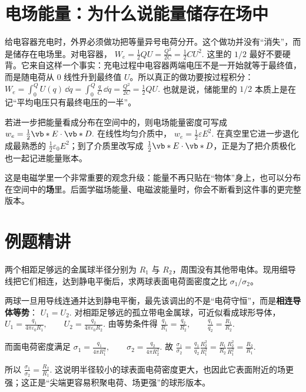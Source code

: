 \documentclass[lang=cn,11pt]{elegantbook}
\newcommand{\bridge}[1]{\begin{note}#1\end{note}}
\begin{document}
\section{电场能量：为什么说能量储存在场中}

给电容器充电时，外界必须做功把等量异号电荷分开。这个做功并没有“消失”，而是储存在电场里。对电容器，
 \(W_e=\frac{1}{2}QU =\frac{Q^2}{2C} =\frac{1}{2}CU^2.\) 
这里的 \(1/2\) 最好不要硬背。它来自这样一个事实：充电过程中电容器两端电压不是一开始就等于最终值，而是随电荷从 \(0\) 线性升到最终值 \(U\)。所以真正的做功要按过程积分：
 \(W_e=\int_0^Q U(q)\,\dd q =\int_0^Q \frac{q}{C}\,\dd q =\frac{Q^2}{2C} =\frac12 QU.\) 
也就是说，储能里的 \(1/2\) 本质上是在记“平均电压只有最终电压的一半”。

若进一步把能量看成分布在空间中的，则电场能量密度可写成
 \(w_e=\frac{1}{2}\vb*{E}\cdot \vb*{D}.\) 
在线性均匀介质中，
 \(w_e=\frac{1}{2}\varepsilon E^2.\) 
在真空里它进一步退化成最熟悉的 \(\frac12\varepsilon_0E^2\)；到了介质里改写成 \(\frac12\vb*{E}\cdot\vb*{D}\)，正是为了把介质极化也一起记进能量账本。

\bridge{这是电磁学里一个非常重要的观念升级：能量不再只贴在“物体”身上，也可以分布在空间中的\textbf{场}里。后面学磁场能量、电磁波能量时，你会不断看到这件事的更完整版本。}

\section{例题精讲}

\begin{exercise}[相连金属球的表面电荷密度比]
两个相距足够远的金属球半径分别为 \(R_1\) 与 \(R_2\)，周围没有其他带电体。现用细导线把它们相连，达到静电平衡后，求两球表面电荷面密度之比 \(\sigma_1/\sigma_2\)。
\end{exercise}

\begin{solution}
两球一旦用导线连通并达到静电平衡，最先该调出的不是“电荷守恒”，而是\textbf{相连导体等势}：
 \(U_1=U_2.\) 
对相距足够远的孤立带电金属球，可近似看成球形导体，
 \(U_1=\frac{q_1}{4\pi\varepsilon_0R_1}, \qquad U_2=\frac{q_2}{4\pi\varepsilon_0R_2}.\) 
由等势条件得
 \(\frac{q_1}{R_1}=\frac{q_2}{R_2}, \qquad \frac{q_1}{q_2}=\frac{R_1}{R_2}.\) 

而面电荷密度满足
 \(\sigma_1=\frac{q_1}{4\pi R_1^2}, \qquad \sigma_2=\frac{q_2}{4\pi R_2^2}.\) 
故
 \(\frac{\sigma_1}{\sigma_2} =\frac{q_1}{q_2}\frac{R_2^2}{R_1^2} =\frac{R_1}{R_2}\frac{R_2^2}{R_1^2} =\frac{R_2}{R_1}.\) 

所以
 \(\boxed{\frac{\sigma_1}{\sigma_2}=\frac{R_2}{R_1}}.\) 
这说明半径较小的球表面电荷密度更大，也因此它表面附近的场更强；这正是“尖端更容易积聚电荷、场更强”的球形版本。
\end{solution}
\end{document}
